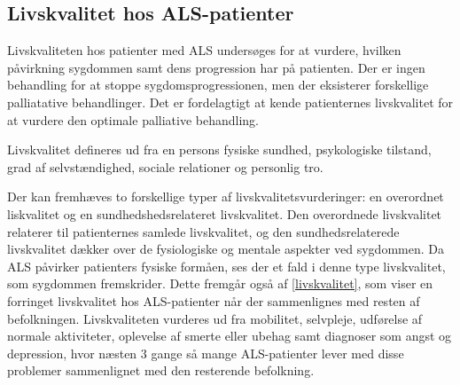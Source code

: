 \subsection{Livskvalitet hos ALS-patienter}
Livskvaliteten hos patienter med ALS undersøges for at vurdere, hvilken påvirkning sygdommen samt dens progression har på patienten. Der er ingen behandling for at stoppe sygdomsprogressionen, men der eksisterer forskellige palliatative behandlinger. Det er fordelagtigt at kende patienternes livskvalitet for at vurdere den optimale palliative behandling. \citep{neudert2004,ilse2015}

Livskvalitet defineres ud fra en persons fysiske sundhed, psykologiske tilstand, grad af selvstændighed, sociale relationer og personlig tro. \citep{pagnini2013}

Der kan fremhæves to forskellige typer af livskvalitetsvurderinger: en overordnet liskvalitet og en sundhedshedsrelateret livskvalitet. 
Den overordnede livskvalitet relaterer til patienternes samlede livskvalitet, og den sundhedsrelaterede livskvalitet dækker over de fysiologiske og mentale aspekter ved sygdommen. \citep{ilse2015, nuebert2004} Da ALS påvirker patienters fysiske formåen, ses der et fald i denne type livskvalitet, som sygdommen fremskrider. \citep{ilse2015} Dette fremgår også af \autoref{livskvalitet}, som viser en forringet livskvalitet hos ALS-patienter når der sammenlignes med resten af befolkningen. Livskvaliteten vurderes ud fra mobilitet, selvpleje, udførelse af normale aktiviteter, oplevelse af smerte eller ubehag samt diagnoser som angst og depression, hvor næsten 3 gange så mange ALS-patienter lever med disse problemer sammenlignet med den resterende befolkning.

